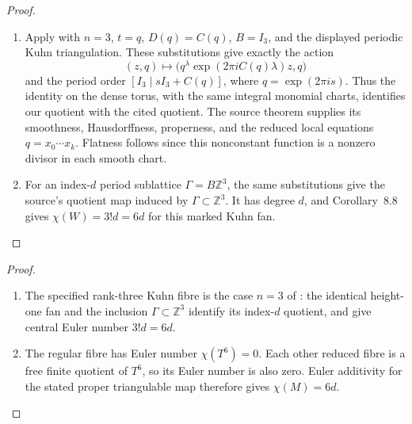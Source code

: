 \begin{proof}
\begin{enumerate}[label=\arabic*.]
\item Apply \cite[Theorem~8.7 and Corollary~8.8, pp.~57--59, attached-source edition]{Yang2026}
with $n=3$, $t=q$, $D(q)=C(q)$, $B=I_3$, and the displayed
periodic Kuhn triangulation.  These substitutions give exactly the
action
\[
 (z,q)\longmapsto
 \bigl(q^\lambda\exp(2\pi iC(q)\lambda)z,q\bigr)
\]
and the period order $[I_3\mid sI_3+C(q)]$, where
$q=\exp(2\pi i s)$.  Thus the identity on the dense torus, with
the same integral monomial charts, identifies our quotient with
the cited quotient.  The source theorem supplies its smoothness,
Hausdorffness, properness, and the reduced local equations
$q=x_0\cdots x_k$.  Flatness follows since this nonconstant
function is a nonzero divisor in each smooth chart.
\item For an index-$d$ period sublattice $\Gamma=B\mathbb Z^3$,
the same substitutions give the source's quotient map induced
by $\Gamma\subset\mathbb Z^3$.  It has degree $d$, and
Corollary~8.8 gives $\chi(W)=3!d=6d$ for this marked Kuhn fan.
\end{enumerate}
\end{proof}

\begin{proof}
\begin{enumerate}[label=\arabic*.]
\item The specified rank-three Kuhn fibre is the case $n=3$
of \cite[Corollary~8.8, p.~59, attached-source edition]{Yang2026}: the identical
height-one fan and the inclusion $\Gamma\subset\mathbb Z^3$
identify its index-$d$ quotient, and give central Euler number
$3!d=6d$.
\item The regular fibre has Euler number $\chi(T^6)=0$.
Each other reduced fibre is a free finite quotient of $T^6$,
so its Euler number is also zero.  Euler additivity for the
stated proper triangulable map therefore gives $\chi(M)=6d$.
\end{enumerate}
\end{proof}
